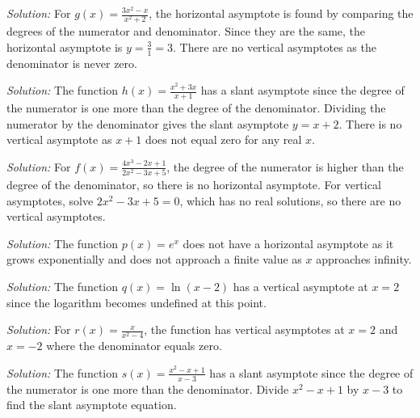 \documentclass[a4paper,12pt]{book}
\newenvironment{solution}[1][]
{\par\noindent\textit{Solution:} \rmfamily}{\medskip}
\begin{document}
\begin{solution}[1]
For \( g(x) = \frac{3x^2 - x}{x^2 + 2} \), the horizontal asymptote is found by comparing the degrees of the numerator and denominator. Since they are the same, the horizontal asymptote is \( y = \frac{3}{1} = 3 \). There are no vertical asymptotes as the denominator is never zero.
\end{solution}

\begin{solution}[2]
The function \( h(x) = \frac{x^2 + 3x}{x + 1} \) has a slant asymptote since the degree of the numerator is one more than the degree of the denominator. Dividing the numerator by the denominator gives the slant asymptote \( y = x + 2 \). There is no vertical asymptote as \( x + 1 \) does not equal zero for any real \( x \).
\end{solution}

\begin{solution}[3]
For \( f(x) = \frac{4x^3 - 2x + 1}{2x^2 - 3x + 5} \), the degree of the numerator is higher than the degree of the denominator, so there is no horizontal asymptote. For vertical asymptotes, solve \( 2x^2 - 3x + 5 = 0 \), which has no real solutions, so there are no vertical asymptotes.
\end{solution}

\begin{solution}[4]
The function \( p(x) = e^x \) does not have a horizontal asymptote as it grows exponentially and does not approach a finite value as \( x \) approaches infinity.
\end{solution}

\begin{solution}[5]
The function \( q(x) = \ln(x - 2) \) has a vertical asymptote at \( x = 2 \) since the logarithm becomes undefined at this point.
\end{solution}

\begin{solution}[6]
For \( r(x) = \frac{x}{x^2 - 4} \), the function has vertical asymptotes at \( x = 2 \) and \( x = -2 \) where the denominator equals zero.
\end{solution}

\begin{solution}[7]
The function \( s(x) = \frac{x^2 - x + 1}{x - 3} \) has a slant asymptote since the degree of the numerator is one more than the denominator. Divide \( x^2 - x + 1 \) by \( x - 3 \) to find the slant asymptote equation.
\end{solution}
\end{document}
